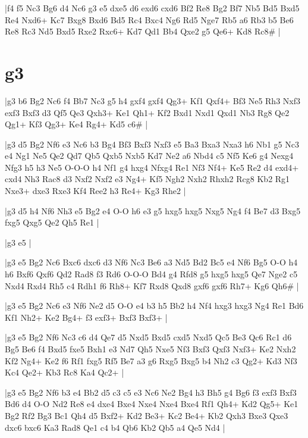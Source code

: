 \whitename{}
\blackname{}
\makegametitle
|f4 f5 Nc3 Bg6 d4 Nc6 g3 e5 dxe5 d6 exd6 cxd6 Bf2 Re8 Bg2 Bf7 Nb5 Bd5 Bxd5 Re4 Nxd6+ Kc7 Bxg8 Bxd6 Bd5 Rc4 Bxc4 Ng6 Rd5 Nge7 Rb5 a6 Rb3 b5 Be6 Re8 Rc3 Nd5 Bxd5 Rxe2 Rxc6+ Kd7 Qd1 Bb4 Qxe2 g5 Qe6+ Kd8 Rc8\#  |

\section{g3}

\whitename{}
\blackname{}
\makegametitle
|g3 b6 Bg2 Nc6 f4 Bb7 Nc3 g5 h4 gxf4 gxf4 Qg3+ Kf1 Qxf4+ Bf3 Ne5 Rh3 Nxf3 exf3 Bxf3 d3 Qf5 Qe3 Qxh3+ Ke1 Qh1+ Kf2 Bxd1 Nxd1 Qxd1 Nb3 Rg8 Qe2 Qg1+ Kf3 Qg3+ Ke4 Rg4+ Kd5 c6\#  |

\whitename{}
\blackname{}
\makegametitle
|g3 d5 Bg2 Nf6 e3 Nc6 b3 Bg4 Bf3 Bxf3 Nxf3 e5 Ba3 Bxa3 Nxa3 h6 Nb1 g5 Nc3 e4 Ng1 Ne5 Qe2 Qd7 Qb5 Qxb5 Nxb5 Kd7 Ne2 a6 Nbd4 c5 Nf5 Ke6 g4 Nexg4 Nfg3 h5 h3 Ne5 O-O-O h4 Nf1 g4 hxg4 Nfxg4 Re1 Nf3 Nf4+ Ke5 Re2 d4 exd4+ cxd4 Nh3 Rac8 d3 Nxf2 Nxf2 e3 Ng4+ Kf5 Ngh2 Nxh2 Rhxh2 Rcg8 Kb2 Rg1 Nxe3+ dxe3 Rxe3 Kf4 Ree2 h3 Re4+ Kg3 Rhe2  |

\whitename{}
\blackname{}
\makegametitle
|g3 d5 h4 Nf6 Nh3 e5 Bg2 e4 O-O h6 e3 g5 hxg5 hxg5 Nxg5 Ng4 f4 Be7 d3 Bxg5 fxg5 Qxg5 Qe2 Qh5 Re1  |

\whitename{}
\blackname{}
\makegametitle
|g3 e5  |

\whitename{}
\blackname{}
\makegametitle
|g3 e5 Bg2 Nc6 Bxc6 dxc6 d3 Nf6 Nc3 Be6 a3 Nd5 Bd2 Bc5 e4 Nf6 Bg5 O-O h4 h6 Bxf6 Qxf6 Qd2 Rad8 f3 Rd6 O-O-O Bd4 g4 Rfd8 g5 hxg5 hxg5 Qe7 Nge2 c5 Nxd4 Rxd4 Rh5 c4 Rdh1 f6 Rh8+ Kf7 Rxd8 Qxd8 gxf6 gxf6 Rh7+ Kg6 Qh6\#  |

\whitename{}
\blackname{}
\makegametitle
|g3 e5 Bg2 Nc6 e3 Nf6 Ne2 d5 O-O e4 b3 h5 Bb2 h4 Nf4 hxg3 hxg3 Ng4 Re1 Bd6 Kf1 Nh2+ Ke2 Bg4+ f3 exf3+ Bxf3 Bxf3+  |

\whitename{}
\blackname{}
\makegametitle
|g3 e5 Bg2 Nf6 Nc3 c6 d4 Qe7 d5 Nxd5 Bxd5 cxd5 Nxd5 Qc5 Be3 Qc6 Rc1 d6 Bg5 Be6 f4 Bxd5 fxe5 Bxh1 e3 Nd7 Qh5 Nxe5 Nf3 Bxf3 Qxf3 Nxf3+ Ke2 Nxh2 Kf2 Ng4+ Ke2 f6 Rf1 fxg5 Rf5 Be7 a3 g6 Rxg5 Bxg5 b4 Nh2 c3 Qg2+ Kd3 Nf3 Kc4 Qe2+ Kb3 Rc8 Ka4 Qc2+  |

\whitename{}
\blackname{}
\makegametitle
|g3 e5 Bg2 Nf6 b3 e4 Bb2 d5 c3 c5 e3 Nc6 Ne2 Bg4 h3 Bh5 g4 Bg6 f3 exf3 Bxf3 Bd6 d4 O-O Nd2 Re8 e4 dxe4 Bxe4 Nxe4 Nxe4 Bxe4 Rf1 Qh4+ Kd2 Qg5+ Ke1 Bg2 Rf2 Bg3 Bc1 Qh4 d5 Bxf2+ Kd2 Be3+ Kc2 Be4+ Kb2 Qxh3 Bxe3 Qxe3 dxc6 bxc6 Ka3 Rad8 Qe1 c4 b4 Qb6 Kb2 Qb5 a4 Qe5 Nd4  |

